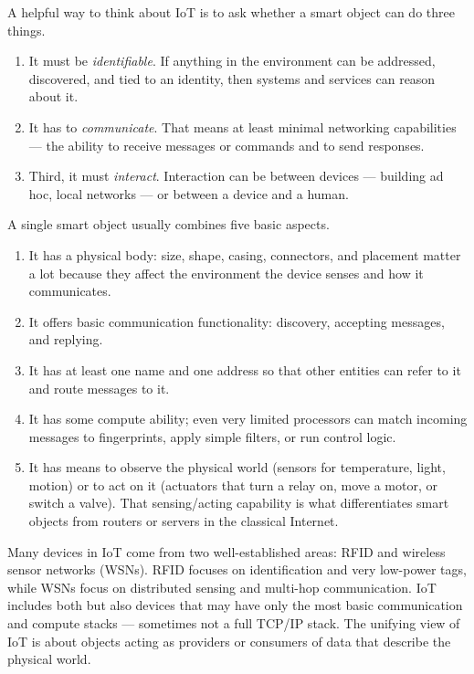 A helpful way to think about IoT is to ask whether a smart object can do three things.
\begin{enumerate}
    \item It must be \textit{identifiable}. If anything in the environment can be addressed, discovered, and tied to an identity, then systems and services can reason about it.
    \item It has to \textit{communicate}. That means at least minimal networking capabilities — the ability to receive messages or commands and to send responses.
    \item Third, it must \textit{interact}. Interaction can be between devices — building ad hoc, local networks — or between a device and a human.
\end{enumerate}
A single smart object usually combines five basic aspects.
\begin{enumerate}
    \item It has a physical body: size, shape, casing, connectors, and placement matter a lot because they affect the environment the device senses and how it communicates.
    \item It offers basic communication functionality: discovery, accepting messages, and replying.
    \item It has at least one name and one address so that other entities can refer to it and route messages to it.
    \item It has some compute ability; even very limited processors can match incoming messages to fingerprints, apply simple filters, or run control logic.
    \item It has means to observe the physical world (sensors for temperature, light, motion) or to act on it (actuators that turn a relay on, move a motor, or switch a valve). That sensing/acting capability is what differentiates smart objects from routers or servers in the classical Internet.
\end{enumerate}
Many devices in IoT come from two well-established areas: RFID and wireless sensor networks (WSNs). RFID focuses on identification and very low-power tags, while WSNs focus on distributed sensing and multi-hop communication. IoT includes both but also devices that may have only the most basic communication and compute stacks — sometimes not a full TCP/IP stack. The unifying view of IoT is about objects acting as providers or consumers of data that describe the physical world.

